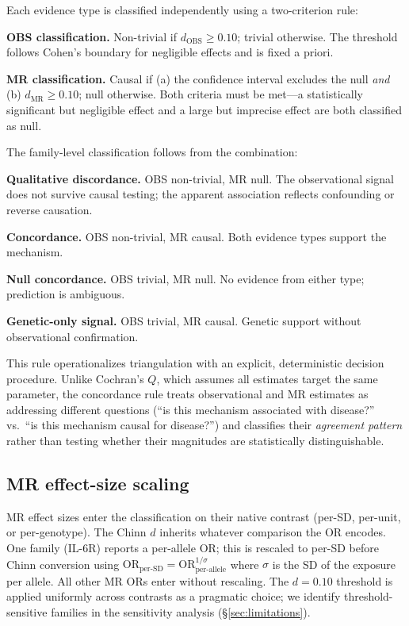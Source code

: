\documentclass[11pt]{article}
\begin{document}
Each evidence type is classified independently using a two-criterion rule:

\textbf{OBS classification.} Non-trivial if $d_{\text{OBS}} \geq 0.10$; trivial otherwise. The threshold follows Cohen's boundary for negligible effects and is fixed a priori.

\textbf{MR classification.} Causal if (a) the confidence interval excludes the null \emph{and} (b) $d_{\text{MR}} \geq 0.10$; null otherwise. Both criteria must be met---a statistically significant but negligible effect and a large but imprecise effect are both classified as null.

The family-level classification follows from the combination:

\textbf{Qualitative discordance.} OBS non-trivial, MR null. The observational signal does not survive causal testing; the apparent association reflects confounding or reverse causation.

\textbf{Concordance.} OBS non-trivial, MR causal. Both evidence types support the mechanism.

\textbf{Null concordance.} OBS trivial, MR null. No evidence from either type; prediction is ambiguous.

\textbf{Genetic-only signal.} OBS trivial, MR causal. Genetic support without observational confirmation.

This rule operationalizes triangulation \cite{lawlor2016} with an explicit, deterministic decision procedure. Unlike Cochran's $Q$, which assumes all estimates target the same parameter, the concordance rule treats observational and MR estimates as addressing different questions (``is this mechanism associated with disease?'' vs.\ ``is this mechanism causal for disease?'') and classifies their \emph{agreement pattern} rather than testing whether their magnitudes are statistically distinguishable.

\subsection{MR effect-size scaling}

MR effect sizes enter the classification on their native contrast (per-SD, per-unit, or per-genotype). The Chinn $d$ inherits whatever comparison the OR encodes. One family (IL-6R) reports a per-allele OR; this is rescaled to per-SD before Chinn conversion using $\text{OR}_{\text{per-SD}} = \text{OR}_{\text{per-allele}}^{1/\sigma}$ where $\sigma$ is the SD of the exposure per allele. All other MR ORs enter without rescaling. The $d = 0.10$ threshold is applied uniformly across contrasts as a pragmatic choice; we identify threshold-sensitive families in the sensitivity analysis (\S\ref{sec:limitations}).
\end{document}
